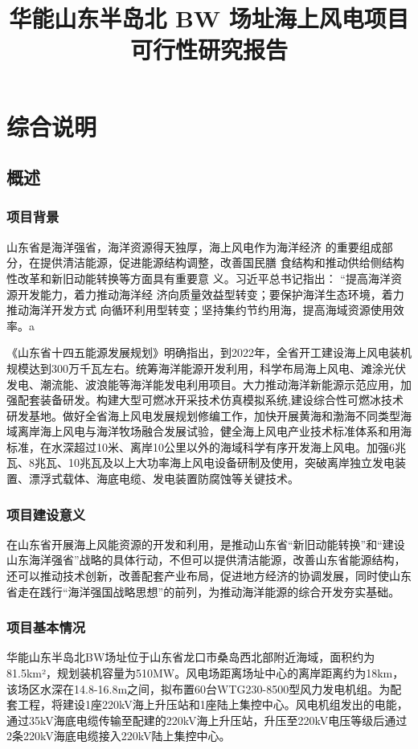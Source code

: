 \documentclass[12pt, letterpaper]{article}
\title{ \textbf{华能山东半岛北 BW 场址海上风电项目} \\
	可行性研究报告}
\begin{document}
	
	\maketitle
	
	\tableofcontents
	
	\section{综合说明}
	\subsection{概述}
	\subsubsection{项目背景}
	山东省是海洋强省，海洋资源得天独厚，海上风电作为海洋经济
	的重要组成部分，在提供清洁能源，促进能源结构调整，改善国民膳
	食结构和推动供给侧结构性改革和新旧动能转换等方面具有重要意
	义。习近平总书记指出： “提高海洋资源开发能力，着力推动海洋经
	济向质量效益型转变；要保护海洋生态环境，着力推动海洋开发方式
	向循环利用型转变；坚持集约节约用海，提高海域资源使用效率。a
	
	
	《山东省十四五能源发展规划》明确指出，到2022年，全省开工建设海上风电装机规模达到300万千瓦左右。统筹海洋能源开发利用，科学布局海上风电、滩涂光伏发电、潮流能、波浪能等海洋能发电利用项目。大力推动海洋新能源示范应用，加强配套装备研发。构建大型可燃冰开采技术仿真模拟系统,建设综合性可燃冰技术研发基地。做好全省海上风电发展规划修编工作，加快开展黄海和渤海不同类型海域离岸海上风电与海洋牧场融合发展试验，健全海上风电产业技术标准体系和用海标准，在水深超过10米、离岸10公里以外的海域科学有序开发海上风电。加强6兆瓦、8兆瓦、10兆瓦及以上大功率海上风电设备研制及使用，突破离岸独立发电装置、漂浮式载体、海底电缆、发电装置防腐蚀等关键技术。
	
	\subsubsection{项目建设意义}
	在山东省开展海上风能资源的开发和利用，是推动山东省“新旧动能转换”和“建设山东海洋强省”战略的具体行动，不但可以提供清洁能源，改善山东省能源结构，还可以推动技术创新，改善配套产业布局，促进地方经济的协调发展，同时使山东省走在践行“海洋强国战略思想”的前列，为推动海洋能源的综合开发夯实基础。
	
	\subsubsection{项目基本情况}
	华能山东半岛北BW场址位于山东省龙口市桑岛西北部附近海域，面积约为81.5km²，规划装机容量为510MW。风电场距离场址中心的离岸距离约为18km，该场区水深在14.8-16.8m之间，拟布置60台WTG230-8500型风力发电机组。为配套工程，将建设1座220kV海上升压站和1座陆上集控中心。风电机组发出的电能，通过35kV海底电缆传输至配建的220kV海上升压站，升压至220kV电压等级后通过2条220kV海底电缆接入220kV陆上集控中心。
	
\end{document}
